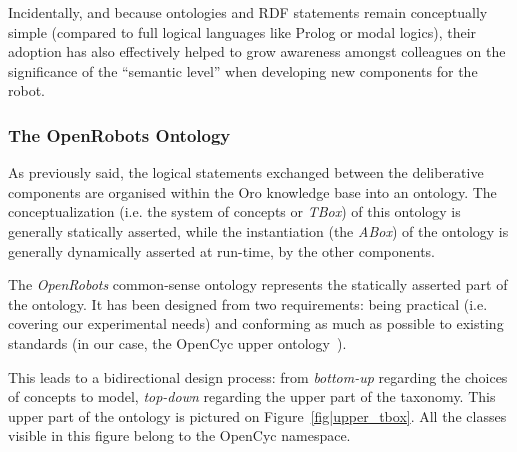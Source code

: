 \documentclass[preprint,3p,times]{elsarticle}
\newcommand{\ie}{i.e.\xspace}
\begin{document}
Incidentally, and because ontologies and RDF statements remain conceptually
simple (compared to full logical languages like {\sc Prolog} or modal logics),
their adoption has also effectively helped to grow awareness amongst colleagues
on the significance of the ``semantic level'' when developing new components
for the robot.

\subsubsection{The OpenRobots Ontology}

As previously said, the logical statements exchanged between the deliberative
components are organised within the {\sc Oro} knowledge base into an ontology.
The conceptualization (\ie the system of concepts or \emph{TBox}) of this
ontology is generally statically asserted, while the instantiation (the
\emph{ABox}) of the ontology is generally dynamically asserted at run-time, by
the other components.

The \emph{OpenRobots} common-sense ontology represents the statically asserted
part of the ontology. It has been designed from two requirements: being
practical (\ie covering our experimental needs) and conforming as much as
possible to existing standards (in our case, the {\sc OpenCyc} upper
ontology~\cite{lenat1990cyc}).

This leads to a bidirectional design process: from \emph{bottom-up} regarding
the choices of concepts to model, \emph{top-down} regarding the upper part of
the taxonomy. This upper part of the ontology is pictured on
Figure~\ref{fig|upper_tbox}. All the classes visible in this figure belong to
the {\sc OpenCyc} namespace.
\end{document}
